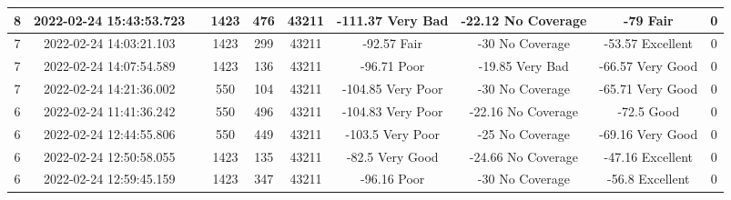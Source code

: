 \begin{longtable*}{|c|c|c|c|c|c|c|c|c|c|}
8&2022-02-24 15:43:53.723&&1423&476&43211& -111.37   Very Bad    & -22.12    No Coverage & -79       Fair        & 0\\\hline
{}7&2022-02-24 14:03:21.103&&1423&299&43211& -92.57    Fair        & -30       No Coverage & -53.57    Excellent   & 0\\\hline
{}7&2022-02-24 14:07:54.589&&1423&136&43211& -96.71    Poor        & -19.85    Very Bad    & -66.57    Very Good   & 0\\\hline
{}7&2022-02-24 14:21:36.002&&550&104&43211& -104.85   Very Poor   & -30       No Coverage & -65.71    Very Good   & 0\\\hline
{}6&2022-02-24 11:41:36.242&&550&496&43211& -104.83   Very Poor   & -22.16    No Coverage & -72.5     Good        & 0\\\hline
{}6&2022-02-24 12:44:55.806&&550&449&43211& -103.5    Very Poor   & -25       No Coverage & -69.16    Very Good   & 0\\\hline
{}6&2022-02-24 12:50:58.055&&1423&135&43211& -82.5     Very Good   & -24.66    No Coverage & -47.16    Excellent   & 0\\\hline
{}6&2022-02-24 12:59:45.159&&1423&347&43211& -96.16    Poor        & -30       No Coverage & -56.8     Excellent   & 0\\\hline

\end{longtable*}
